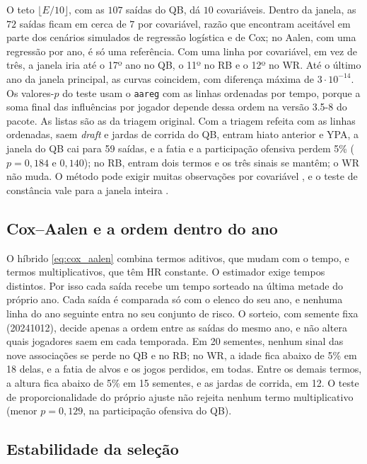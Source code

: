 O teto $\lfloor E/10 \rfloor$, com as $107$ saídas do QB, dá $10$ covariáveis. Dentro da janela, as $72$ saídas ficam em cerca de $7$ por covariável, razão que \citet{vittinghoff2007} encontram aceitável em parte dos cenários simulados de regressão logística e de Cox; no Aalen, com uma regressão por ano, é só uma referência. Com uma linha por covariável, em vez de três, a janela iria até o 17º ano no QB, o 11º no RB e o 12º no WR. Até o último ano da janela principal, as curvas coincidem, com diferença máxima de $3\cdot10^{-14}$. Os valores-$p$ do teste usam o \texttt{aareg} \citep{survival-package} com as linhas ordenadas por tempo, porque a soma final das influências por jogador depende dessa ordem na versão 3.5-8 do pacote. As listas são as da triagem original. Com a triagem refeita com as linhas ordenadas, saem \textit{draft} e jardas de corrida do QB, entram hiato anterior e YPA, a janela do QB cai para 59 saídas, e a fatia e a participação ofensiva perdem 5\% ($p=0{,}184$ e $0{,}140$); no RB, entram dois termos e os três sinais se mantêm; o WR não muda. O método pode exigir muitas observações por covariável \citep{aalen1980}, e o teste de constância vale para a janela inteira \citep{martinussen2006}.

\subsection{Cox--Aalen e a ordem dentro do ano}
\label{subsec:apend_cox_aalen}

O híbrido \eqref{eq:cox_aalen} combina termos aditivos, que mudam com o tempo, e termos multiplicativos, que têm HR constante. O estimador exige tempos distintos. Por isso cada saída recebe um tempo sorteado na última metade do próprio ano. Cada saída é comparada só com o elenco do seu ano, e nenhuma linha do ano seguinte entra no seu conjunto de risco. O sorteio, com semente fixa (20241012), decide apenas a ordem entre as saídas do mesmo ano, e não altera quais jogadores saem em cada temporada. Em 20 sementes, nenhum sinal das nove associações se perde no QB e no RB; no WR, a idade fica abaixo de 5\% em 18 delas, e a fatia de alvos e os jogos perdidos, em todas. Entre os demais termos, a altura fica abaixo de 5\% em 15 sementes, e as jardas de corrida, em 12. O teste de proporcionalidade do próprio ajuste \citep{martinussen2006} não rejeita nenhum termo multiplicativo (menor $p=0{,}129$, na participação ofensiva do QB).

\subsection{Estabilidade da seleção}
\label{subsec:apend_frequencia}


